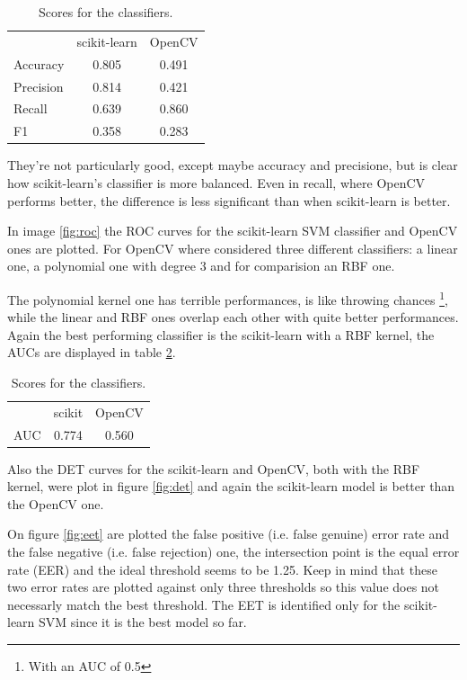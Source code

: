 \begin{table}[h!t]
    \centering
    \caption{Scores for the classifiers.}
    \label{tab:scores}
    \begin{tabular}{lcc}
        & scikit-learn & OpenCV \\
        Accuracy & 0.805 & 0.491 \\
        Precision & 0.814 & 0.421 \\
        Recall & 0.639 & 0.860 \\
        F1 & 0.358 & 0.283 \\
    \end{tabular}
\end{table}

They're not particularly good, except maybe accuracy and precisione, but is clear how scikit-learn's classifier is more balanced. 
Even in recall, where OpenCV performs better, the difference is less significant than when scikit-learn is better.

In image \ref{fig:roc} the ROC curves for the scikit-learn SVM classifier and OpenCV ones are plotted.
For OpenCV where considered three different classifiers: a linear one, a polynomial one with degree 3 and for comparision an RBF one.

The polynomial kernel one has terrible performances, is like throwing chances \footnote{With an AUC of 0.5}, while the linear and RBF ones overlap each other with quite better performances.
Again the best performing classifier is the scikit-learn with a RBF kernel, the AUCs are displayed in table \ref{tab:auc}.

\begin{table}[h!t]
    \centering
    \caption{Scores for the classifiers.}
    \label{tab:auc}
    \begin{tabular}{lcc}
        & scikit & OpenCV \\
        AUC & 0.774 & 0.560 \\
    \end{tabular}
\end{table}

Also the DET curves for the scikit-learn and OpenCV, both with the RBF kernel, were plot in figure \ref{fig:det} and again the scikit-learn model is better than the OpenCV one.

On figure \ref{fig:eet} are plotted the false positive (i.e. false genuine) error rate and the false negative (i.e. false rejection) one, the intersection point is the equal error rate (EER) and the ideal threshold seems to be 1.25.
Keep in mind that these two error rates are plotted against only three thresholds so this value does not necessarly match the best threshold. 
The EET is identified only for the scikit-learn SVM since it is the best model so far.

